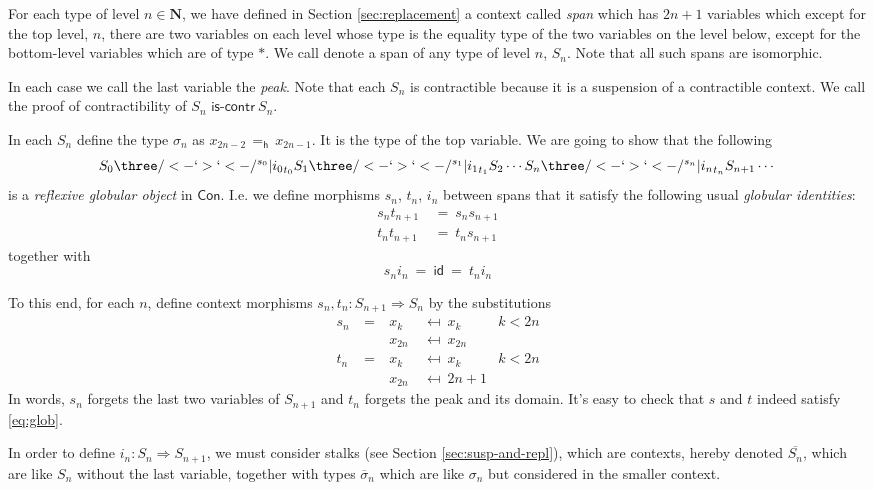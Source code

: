 For each type of level $n\in \mathbf{N}$, we have defined in Section \ref{sec:replacement} a context called
\emph{span} which has $2n+1$ variables
which except for the top level, $n$, there are two variables on each
level whose type is the equality type of the two variables on the
level below, except for the bottom-level variables which are of type $\ast$. 
We call denote a span of any type of level $n$, $S_n$. Note that all
such spans are isomorphic. 

In each case we call the last variable the
\emph{peak}. Note that each $S_n$ is contractible because it is a
suspension of a contractible context. We call the proof of
contractibility of $S_n$ $\mathsf{is\text{-}contr}~S_n$. 

In each $S_n$ define the type $\sigma_n$ as $x_{2n-2}\,=_\mathsf{h}\,x_{2n-1}$. It is the type of the top variable. We are going to show that the following 
\[
S_0 \three/<-`>`<-/^{s_0}|{i_0}_{t_0} S_1 \three/<-`>`<-/^{s_1}|{i_1}_{t_1} S_2 \cdots S_n
\three/<-`>`<-/^{s_n}|{i_n}_{t_n} S_{n+1} \cdots
\]
is a \emph{reflexive globular object} in $\mathsf{Con}$. I.e. we define
morphisms $s_n$, $t_n$, $i_n$ between spans that it satisfy the
following usual \emph{globular identities}:
\begin{equation}\label{eq:glob}
\begin{array}{rl}
s_n t_{n+1}&~=~s_n s_{n+1}\\
t_n t_{n+1}&~=~t_n s_{n+1}
\end{array}
\end{equation}
% 
together with
\begin{equation}
  \label{eq:refl-glob}
  s_n i_n ~= ~\mathsf{id}~=~ t_ni_n
\end{equation}

To this end, for each $n$, define context morphisms $s_n, t_n  : S_{n+1}
\Rightarrow S_n$ by the substitutions
\begin{align*}
s_n &~=~& x_k &~\mapsfrom~x_k &k < 2n\\
&&x_{2n} &~\mapsfrom~x_{2n} \\
t_n &~=~& x_k &~\mapsfrom~x_k &k < 2n\\
&&x_{2n} &~\mapsfrom~2n+1
\end{align*}
%
In words, $s_n$ forgets the last two variables of $S_{n+1}$ and
$t_n$ forgets the peak and its domain. It's easy to check that $s$ and
$t$ indeed satisfy \eqref{eq:glob}.


In order to define $i_n :  S_n \Rightarrow S_{n+1}$, 
we must consider stalks (see Section \ref{sec:susp-and-repl}), which
are contexts, hereby denoted $\overline{S_n}$, which are like
$S_n$ without the last variable, together with types
$\overline{\sigma}_n$ which are like $\sigma_n$ but considered in the
smaller context. 

